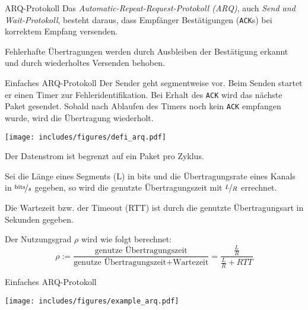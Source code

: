 \begin{defi}{ARQ-Protokoll}
    Das \emph{Automatic-Repeat-Request-Protokoll (ARQ)}, auch \emph{Send and Wait-Protokoll}, besteht daraus, dass Empfänger Bestätigungen (\texttt{ACK}s) bei korrektem Empfang versenden.

    Fehlerhafte Übertragungen werden durch Ausbleiben der Bestätigung erkannt und durch wiederholtes Versenden behoben.
\end{defi}

\begin{defi}{Einfaches ARQ-Protokoll}
    Der Sender geht segmentweise vor.
    Beim Senden startet er einen Timer zur Fehleridentifikation.
    Bei Erhalt des \texttt{ACK} wird das nächste Paket gesendet.
    Sobald nach Ablaufen des Timers noch kein \texttt{ACK} empfangen wurde, wird die Übertragung wiederholt.

    \begin{center}
        \texttt{[image: includes/figures/defi\_arq.pdf]}
    \end{center}

    Der Datenstrom ist begrenzt auf ein Paket pro Zyklus.

    Sei die Länge eines Segments (L) in bits und die Übertragungsrate eines Kanals in $\nicefrac{\text{bits}}{s}$ gegeben, so wird die genutzte Übertragungszeit mit $\nicefrac{L}{R}$ errechnet.

    Die Wartezeit bzw. der Timeout (RTT) ist durch die genutzte Übertragungsart in Sekunden gegeben.

    Der Nutzungsgrad $\rho$ wird wie folgt berechnet:
    \[
        \rho := \frac{\text{genutze Übertragungszeit}}{\text{genutze Übertragungszeit} + \text{Wartezeit}} = \frac{\frac{L}{R}}{\frac{L}{R} + RTT}
    \]
\end{defi}

\begin{example}{Einfaches ARQ-Protokoll}
    \begin{center}
        \texttt{[image: includes/figures/example\_arq.pdf]}
    \end{center}
\end{example}

